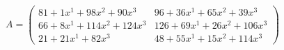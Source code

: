 \documentclass[preview]{standalone}
\begin{document}
\begin{align*}
A = \begin{pmatrix}81 + 1x^{1} + 98x^{2} + 90x^{3} & 96 + 36x^{1} + 65x^{2} + 39x^{3} \\ 66 + 8x^{1} + 114x^{2} + 124x^{3} & 126 + 69x^{1} + 26x^{2} + 106x^{3} \\ 21 + 21x^{1} + 82x^{3} & 48 + 55x^{1} + 15x^{2} + 114x^{3}\end{pmatrix}
\end{align*}
\end{document}

